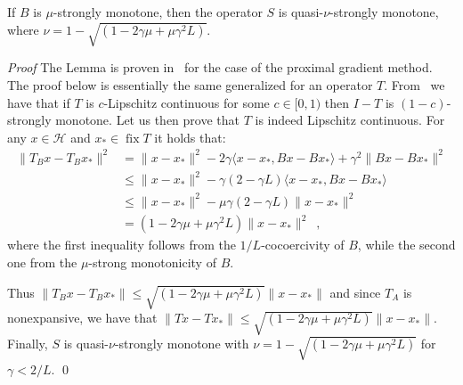 \documentclass[envcountsect]{svjour3}
\begin{document}
\begin{lemma}\label{lem::Sstrongmonotone}
If $B$ is $\mu$-strongly monotone, then the operator $S$ is quasi-$\nu$-strongly monotone, where $\nu=1-\sqrt{(1-2\gamma\mu+\mu\gamma^2L)}$.
\end{lemma}
{\it Proof}  The Lemma is proven in~\cite[Proposition~2]{peng2015arock} for the case of the proximal gradient method. The proof below is essentially the same generalized for an operator $T$.
 From~\cite[Example~22.5]{book_comb} we have that if $T$ is $c$-Lipschitz continuous for some $c\in[0,1)$ then $I-T$ is $(1-c)$-strongly monotone. Let us then prove that $T$ is indeed Lipschitz continuous. For any $x\in\mathcal{H}$ and $x_\ast\in\operatorname{fix} T$ it holds that:
 \begin{align*}
 \|T_Bx-T_Bx_\ast\|^2 \nonumber&= \|x-x_\ast\|^2-2\gamma\langle x-x_\ast,Bx-Bx_\ast\rangle +\gamma^2\|Bx-Bx_\ast\|^2 \\\nonumber
  &\leq \|x-x_\ast\|^2-\gamma(2-\gamma L)\langle x-x_\ast,Bx-Bx_\ast\rangle \\\nonumber
  &\leq \|x-x_\ast\|^2-\mu\gamma(2-\gamma L)\|x-x_\ast\|^2 \\
  &= (1-2\gamma\mu+\mu\gamma^2L)\|x-x_\ast\|^2\enspace,
\end{align*}
where the first inequality follows from the $1/L$-cocoercivity of $B$, while the second one from the $\mu$-strong monotonicity of $B$.

Thus $\|T_Bx-T_Bx_\ast\|\leq \sqrt{(1-2\gamma\mu+\mu\gamma^2L)}\|x-x_\ast\|$ and since $T_A$ is nonexpansive, we have that $\|Tx-Tx_\ast\|\leq \sqrt{(1-2\gamma\mu+\mu\gamma^2L)}\|x-x_\ast\|$. Finally, $S$ is quasi-$\nu$-strongly monotone with $\nu=1-\sqrt{(1-2\gamma\mu+\mu\gamma^2L)}$ for $\gamma<2/L$.
\qed



\end{document}
